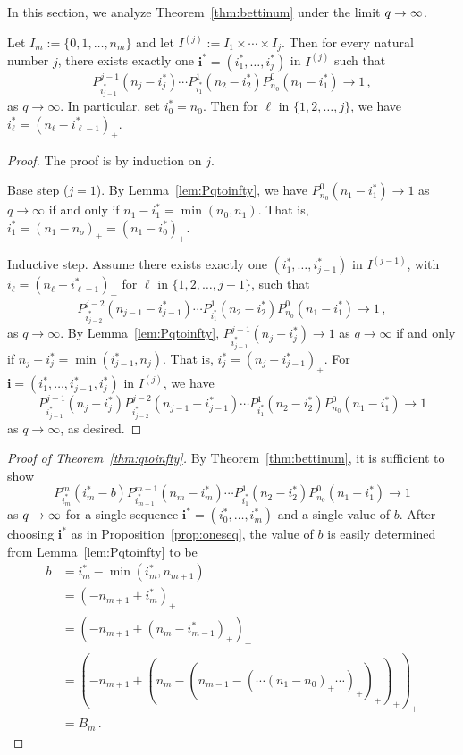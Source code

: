 In this section, we analyze Theorem~\ref{thm:bettinum} under the 
limit $q \rightarrow \infty$.

\begin{proposition}
  \label{prop:oneseq}
Let $I_m:= \{0,1,\ldots, n_m\}$ and let $I^{(j)}:= I_1\times\cdots \times I_j$.
Then for every natural number $j$, there exists exactly one $\mathbf{i}^\ast =
(i_1^\ast,\ldots, i_j^\ast)$ in $I^{(j)}$ such that 
\[
  P_{i_{j-1}^\ast}^{j-1}(n_j-i_j^\ast)\cdots
  P_{i_1^\ast}^1(n_2-i_2^\ast)P_{n_0}^0(n_1-i_1^\ast) \to 1 \, ,
\]
as $q\to\infty$. In particular, set $i_0^\ast = n_0$. Then for $\ell$ in
$\{1,2,\ldots, j\}$, we have $i_\ell^\ast = (n_\ell - i_{\ell - 1}^\ast)_+$.
\end{proposition}

\begin{proof}
The proof is by induction on $j$.

Base step ($j=1$). By Lemma~\ref{lem:Pqtoinfty}, we have $P_{n_0}^0 (n_1 -
i_1^\ast) \to 1$ as $q\to\infty$ if and only if $n_1 - i_1^\ast = \min(n_0,
n_1)$.  That is, $i_1^\ast = (n_1 - n_o)_+ = (n_1 - i_0^\ast)_+$.

Inductive step. Assume there exists exactly one $(i_1^\ast,\ldots ,
i_{j-1}^\ast)$ in $I^{(j-1)}$, with $i_\ell = (n_\ell - i_{\ell-1}^\ast)_+$ for
$\ell$ in $\{1,2,\ldots, j-1\}$, such that 
\[
P_{i_{j-2}^\ast}^{j-2}(n_{j-1} - i_{j-1}^\ast) %
\cdots P_{i_1^\ast}^1 (n_2 - i_2^\ast) P_{n_0}^0 (n_1 - i_1^\ast) \to 1 \, ,
\]
as $q\to\infty$.  By Lemma~\ref{lem:Pqtoinfty}, $P_{i_{j-1}^\ast}^{j-1}(n_j -
i_j^\ast) \to 1$ as $q \to \infty$ if and only if $n_j - i_j^\ast =
\min(i_{j-1}^\ast, n_j)$. That is, $i_j^\ast = (n_j - i_{j-1}^\ast)_+$.  
For $\mathbf{i} = (i_1^\ast,\ldots, i_{j-1}^\ast, i_j^\ast)$ in $I^{(j)}$, we
have
\[
P_{i_{j-1}^\ast}^{j-1}(n_j-i_j^\ast)P_{i_{j-2}^\ast}^{j-2}(n_{j-1}-i_{j-1}^\ast)\cdots P_{i_1^\ast}^1(n_2-i_2^\ast)P_{n_0}^0(n_1-i_1^\ast) \to 1
\]
as $q\to\infty$, as desired.
\end{proof}

\begin{proof}[Proof of Theorem~\ref{thm:qtoinfty}]
  By Theorem~\ref{thm:bettinum}, it is sufficient to show
  \[
    P^m_{i_m^\ast}(i_m^\ast-b) P_{i^\ast_{m-1}}^{m-1}\left(n_{m} -i_m^\ast\right) \cdots
    P_{i_1^\ast}^1\left(n_2 - i_2^\ast\right) P_{n_0}^0 \left(n_1 - i_1^\ast\right) \to 1 
  \]
  as $q \rightarrow \infty$ for a single sequence $\mathbf{i}^\ast=(i_0^\ast, \ldots,
  i_m^\ast)$ and a single
  value of $b$. After choosing $\mathbf{i}^\ast$ as in Proposition~\ref{prop:oneseq},
  the value of $b$ is easily determined from Lemma~\ref{lem:Pqtoinfty} to be
	\begin{align*}
	b 	&= i_m^\ast - \min(i_m^\ast, n_{m+1})\\
		&= (-n_{m+1} + i_m^\ast)_+\\
		&= (-n_{m+1} + (n_m -i_{m-1}^\ast)_+)_+\\
		&= (-n_{m+1} + (n_m - (n_{m-1} - (\cdots (n_1 - n_0)_+ \cdots)_+)_+)_+ )_+\\
        &= B_m \, . 
	\end{align*}
\end{proof}

